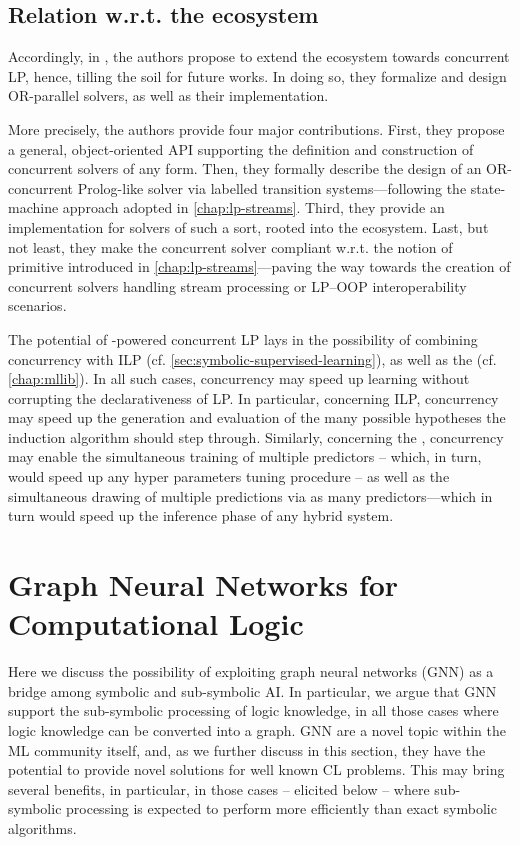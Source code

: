 \documentclass[12pt,a4paper,openright,twoside]{book}
\begin{document}
\subsection{Relation w.r.t. the ecosystem}

Accordingly, in \cite{Giordano2021}, the authors propose to extend the \twopkt{} ecosystem towards concurrent LP, hence, tilling the soil for future works.
%
In doing so, they formalize and design OR-parallel solvers, as well as their implementation.

More precisely, the authors provide four major contributions.
%
First, they propose a general, object-oriented API supporting the definition and construction of concurrent solvers of any form.
%
Then, they formally describe the design of an OR-concurrent Prolog-like solver via labelled transition systems---following the state-machine approach adopted in \cref{chap:lp-streams}.
%
Third, they provide an implementation for solvers of such a sort, rooted into the \twopkt{} ecosystem.
%
Last, but not least, they make the concurrent solver compliant w.r.t. the notion of primitive introduced in \cref{chap:lp-streams}---paving the way towards the creation of concurrent solvers handling stream processing or LP--OOP interoperability scenarios.

The potential of \twopkt{}-powered concurrent LP lays in the possibility of combining concurrency with ILP (cf. \cref{sec:symbolic-supervised-learning}), as well as the \mllib{} (cf. \cref{chap:mllib}).
%
In all such cases, concurrency may speed up learning without corrupting the declarativeness of LP.
%
In particular, concerning ILP, concurrency may speed up the generation and evaluation of the many possible hypotheses the induction algorithm should step through.
%
Similarly, concerning the \mllib{}, concurrency may enable the simultaneous training of multiple predictors -- which, in turn, would speed up any hyper parameters tuning procedure -- as well as the simultaneous drawing of multiple predictions via as many predictors---which in turn would speed up the inference phase of any hybrid system.

\section{Graph Neural Networks for Computational Logic}
\label{sec:gnn}


Here we discuss the possibility of exploiting graph neural networks (GNN) as a bridge among symbolic and sub-symbolic AI.
%
In particular, we argue that GNN support the sub-symbolic processing of logic knowledge, in all those cases where logic knowledge can be converted into a graph.
%
GNN are a novel topic within the ML community itself, and, as we further discuss in this section, they have the potential to provide novel solutions for well known CL problems.
%
This may bring several benefits, in particular, in those cases -- elicited below -- where sub-symbolic processing is expected to perform more efficiently than exact symbolic algorithms.
\end{document}
